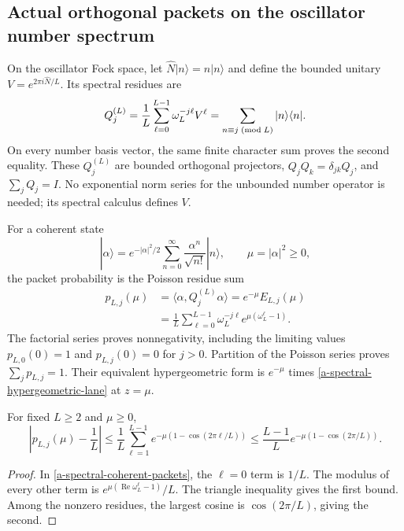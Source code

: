\subsection{Actual orthogonal packets on the oscillator number spectrum}

On the oscillator Fock space, let
$\widehat N|n\rangle=n|n\rangle$ and define the bounded unitary
$V=e^{2\pi i\widehat N/L}$. Its spectral residues are
\begin{equation}
 Q_j^{(L)}=\frac1L\sum_{\ell=0}^{L-1}\omega_L^{-j\ell}V^\ell
          =\sum_{n\equiv j\;({\rm mod}\;L)}|n\rangle\langle n|.
 \label{a-spectral-number-projectors}
\end{equation}
On every number basis vector, the same finite character sum proves the
second equality. These $Q_j^{(L)}$ are bounded orthogonal projectors,
$Q_jQ_k=\delta_{jk}Q_j$, and $\sum_jQ_j=I$. No exponential norm series
for the unbounded number operator is needed; its spectral calculus
defines $V$.

For a coherent state
\[
 |\alpha\rangle=e^{-|\alpha|^2/2}
        \sum_{n=0}^\infty\frac{\alpha^n}{\sqrt{n!}}|n\rangle,
 \qquad \mu=|\alpha|^2\geq0,
\]
the packet probability is the Poisson residue sum
\begin{align}
 p_{L,j}(\mu)
 &=\langle\alpha,Q_j^{(L)}\alpha\rangle
   =e^{-\mu}E_{L,j}(\mu)\nonumber\\
 &=\frac1L\sum_{\ell=0}^{L-1}\omega_L^{-j\ell}
                      e^{\mu(\omega_L^\ell-1)}.
 \label{a-spectral-coherent-packets}
\end{align}
The factorial series proves nonnegativity, including the limiting values
$p_{L,0}(0)=1$ and $p_{L,j}(0)=0$ for $j>0$. Partition of the
Poisson series proves $\sum_jp_{L,j}=1$. Their equivalent hypergeometric
form is $e^{-\mu}$ times \eqref{a-spectral-hypergeometric-lane} at $z=\mu$.

\begin{proposition}
\label{a-spectral-coherent-bound}
For fixed $L\geq2$ and $\mu\geq0$,
\begin{equation}
 \left|p_{L,j}(\mu)-\frac1L\right|
 \leq\frac1L\sum_{\ell=1}^{L-1}
       e^{-\mu(1-\cos(2\pi\ell/L))}
 \leq\frac{L-1}{L}
       e^{-\mu(1-\cos(2\pi/L))}.
 \label{a-spectral-packet-mixing-bound}
\end{equation}
\end{proposition}
\begin{proof}
In \eqref{a-spectral-coherent-packets}, the $\ell=0$ term is $1/L$.
The modulus of every other term is
$e^{\mu(\operatorname{Re}\omega_L^\ell-1)}/L$.
The triangle inequality gives the first bound. Among the nonzero
residues, the largest cosine is $\cos(2\pi/L)$, giving the second.
\end{proof}

